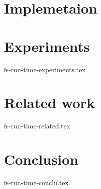 \documentclass[sigconf]{acmart}
\begin{document}
\section {Implemetaion}


\section {Experiments}
 {fs-run-time-experiments.tex}

\section {Related work}
 {fs-run-time-related.tex}

\section {Conclusion}
 {fs-run-time-conclu.tex}



\end{document}

